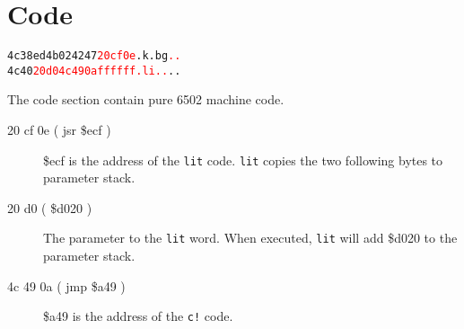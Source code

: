 \section{Code}

\begin{alltt}
4c38  ed 4b 02 42 47 \textcolor{red}{20 cf 0e} .k.bg\textcolor{red}{ ..}
4c40  \textcolor{red}{20 d0 4c 49 0a ff ff ff  .li..}..
\end{alltt}

The code section contain pure 6502 machine code.

\begin{description}
\item[20 cf 0e ( jsr \$ecf )] \$ecf is the address of the \texttt{lit} code. \texttt{lit} copies the two following bytes to parameter stack.
\item[20 d0 ( \$d020 )] The parameter to the \texttt{lit} word. When executed, \texttt{lit} will add \$d020 to the parameter stack.
\item[4c 49 0a ( jmp \$a49 )] \$a49 is the address of the \texttt{c!} code.
\end{description}
